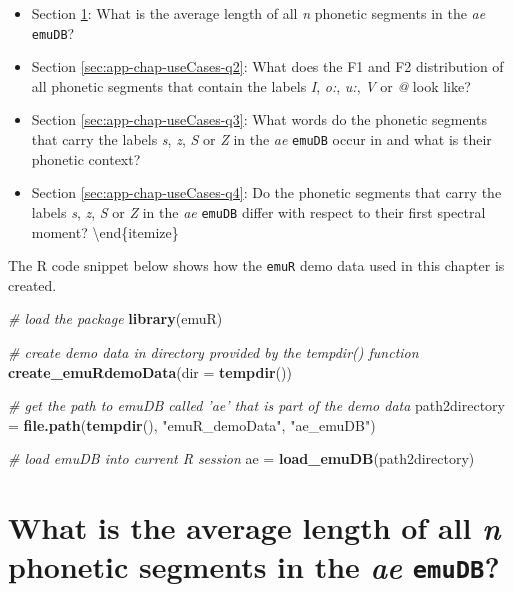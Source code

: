 \documentclass[]{book}
\newenvironment{Shaded}{\begin{snugshade}}{\end{snugshade}}
\newcommand{\CommentTok}[1]{\textcolor[rgb]{0.56,0.35,0.01}{\textit{#1}}}
\newcommand{\DataTypeTok}[1]{\textcolor[rgb]{0.13,0.29,0.53}{#1}}
\newcommand{\KeywordTok}[1]{\textcolor[rgb]{0.13,0.29,0.53}{\textbf{#1}}}
\newcommand{\NormalTok}[1]{#1}
\newcommand{\StringTok}[1]{\textcolor[rgb]{0.31,0.60,0.02}{#1}}
\providecommand{\tightlist}{%
  \setlength{\itemsep}{0pt}\setlength{\parskip}{0pt}}
\theoremstyle{definition}
\theoremstyle{definition}
\theoremstyle{definition}
\theoremstyle{remark}
\begin{document}
\begin{itemize}
\tightlist
\item
  Section \ref{sec:app-chap-useCases-q1}: What is the average length of
  all \emph{n} phonetic segments in the \emph{ae} \texttt{emuDB}?
\item
  Section \ref{sec:app-chap-useCases-q2}: What does the F1 and F2
  distribution of all phonetic segments that contain the labels
  \emph{I}, \emph{o:}, \emph{u:}, \emph{V} or \emph{@} look like?
\item
  Section \ref{sec:app-chap-useCases-q3}: What words do the phonetic
  segments that carry the labels \emph{s}, \emph{z}, \emph{S} or
  \emph{Z} in the \emph{ae} \texttt{emuDB} occur in and what is their
  phonetic context?
\item
  Section \ref{sec:app-chap-useCases-q4}: Do the phonetic segments that
  carry the labels \emph{s}, \emph{z}, \emph{S} or \emph{Z} in the
  \emph{ae} \texttt{emuDB} differ with respect to their first spectral
  moment? \textbackslash{}end\{itemize\}
\end{itemize}

The R code snippet below shows how the \texttt{emuR} demo data used in
this chapter is created.

\begin{Shaded}
\begin{Highlighting}[]
\CommentTok{# load the package }
\KeywordTok{library}\NormalTok{(emuR)}

\CommentTok{# create demo data in directory provided by the tempdir() function}
\KeywordTok{create_emuRdemoData}\NormalTok{(}\DataTypeTok{dir =} \KeywordTok{tempdir}\NormalTok{())}

\CommentTok{# get the path to emuDB called 'ae' that is part of the demo data}
\NormalTok{path2directory =}\StringTok{ }\KeywordTok{file.path}\NormalTok{(}\KeywordTok{tempdir}\NormalTok{(), }\StringTok{"emuR_demoData"}\NormalTok{, }\StringTok{"ae_emuDB"}\NormalTok{)}

\CommentTok{# load emuDB into current R session}
\NormalTok{ae =}\StringTok{ }\KeywordTok{load_emuDB}\NormalTok{(path2directory)}
\end{Highlighting}
\end{Shaded}

\hypertarget{sec:app-chap-useCases-q1}{%
\section{\texorpdfstring{What is the average length of all \emph{n}
phonetic segments in the \emph{ae}
\texttt{emuDB}?}{What is the average length of all n phonetic segments in the ae emuDB?}}\label{sec:app-chap-useCases-q1}}
\end{document}
